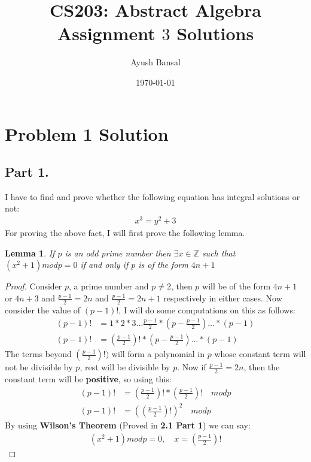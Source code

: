\documentclass{article}
\title{\vspace{80mm}\lightgreyb CS203: Abstract Algebra \\
\lightgreyb Assignment $3$ Solutions}
\author{Ayush Bansal}
\date{\today}
\newtheorem{lemma}{Lemma}
\begin{document}
\clearpage\maketitle
\thispagestyle{empty}
\newpage
\setcounter{page}{1}
\section{Problem 1 Solution}{
  \subsection{Part 1.}{
    I have to find and prove whether the following equation has integral solutions or not:
    \begin{align}
      x^3=y^2+3 \label{eq:1}
    \end{align}
    For proving the above fact, I will first prove the following lemma.
    \begin{lemma}
      If $p$ is an odd prime number then $\exists x \in \mathbb{Z}$ such that $(x^2+1)modp=0$ if and only if $p$ is of the form $4n+1$
    \end{lemma}
    \begin{proof}
      Consider $p$, a prime number and $p \neq 2$, then $p$ will be of the form $4n+1$ or $4n+3$ and $\frac{p-1}{2}=2n$ and $\frac{p-1}{2}=2n+1$ respectively in either cases. \newline
      Now consider the value of $(p-1)!$, I will do some computations on this as follows:
      \begin{align}
        (p-1)!&=1*2*3\dots\frac{p-1}{2}*(p-\frac{p-1}{2})\dots*(p-1) \label{eq:2} \\
        (p-1)!&=(\frac{p-1}{2})!*(p-\frac{p-1}{2})\dots*(p-1)
      \end{align}
    The terms beyond $(\frac{p-1}{2})!)$ will form a polynomial in $p$ whose constant term will not be divisible by $p$, rest will be divisible by $p$. \newline
    Now if $\frac{p-1}{2}=2n$, then the constant term will be \textbf{positive}, so using this:
      \begin{align}
        (p-1)!&=(\frac{p-1}{2})!*(\frac{p-1}{2})! \quad mod p \label{eq:4} \\
        (p-1)!&=((\frac{p-1}{2})!)^2 \quad mod p
      \end{align}
    By using \textbf{Wilson's Theorem} (Proved in \textbf{2.1 Part 1}) we can say:
    \begin{align*}
      (x^2+1)mod p = 0, \quad x=(\frac{p-1}{2})!

\end{align*}
\end{proof}}}
\end{document}
